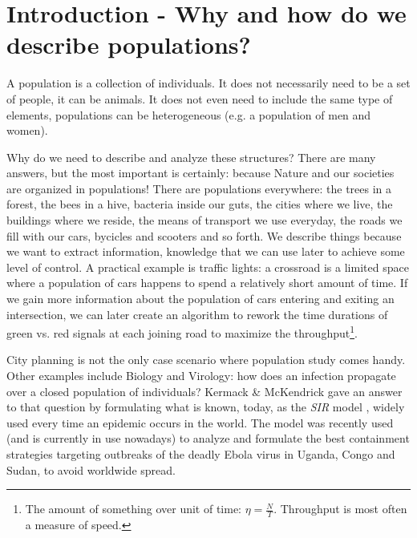 
\section{Introduction - Why and how do we describe populations?}
\label{sec:intro}

A population is a collection of individuals. It does not necessarily need
to be a set of people, it can be animals. It does not even need to include the
same type of elements, populations can be heterogeneous (e.g. a population
of men and women).

Why do we need to describe and analyze these structures? There are many answers,
but the most important is certainly: because Nature and our societies
are organized in populations!
There are populations everywhere:
the trees in a forest, the bees in a hive, bacteria inside our guts,
the cities where we live, the buildings where we reside,
the means of transport we use everyday, the roads we fill with our cars, bycicles and
scooters and so forth. We describe things because we want to extract information, knowledge
that we can use later to achieve some level of control. A practical example is traffic
lights: a crossroad is a limited space where a population of cars happens to spend a
relatively short amount of time.
If we gain more information about the population of cars entering and exiting an
intersection, we can later create an algorithm to rework the time durations of green vs.
red signals at each joining road to maximize the 
throughput\footnote{The amount of something over unit of time: $\eta = \frac{N}{T}$. 
Throughput is most often a measure of speed.}.

City planning is not the only case scenario where population study comes handy. Other
examples include Biology and Virology: how does an infection propagate over a closed
population of individuals? Kermack \& McKendrick \cite{kermack-mckendrick}
gave an answer to that question by formulating what is known, today, as the \textit{SIR} model
\cite{kermack-mckendrick-sir}, widely used every time an epidemic occurs in the world. The
model was recently used (and is currently in use nowadays) to
analyze and formulate the best containment strategies targeting outbreaks of the
deadly Ebola virus \cite{who-ebola} in Uganda, Congo and Sudan, to avoid worldwide spread.

